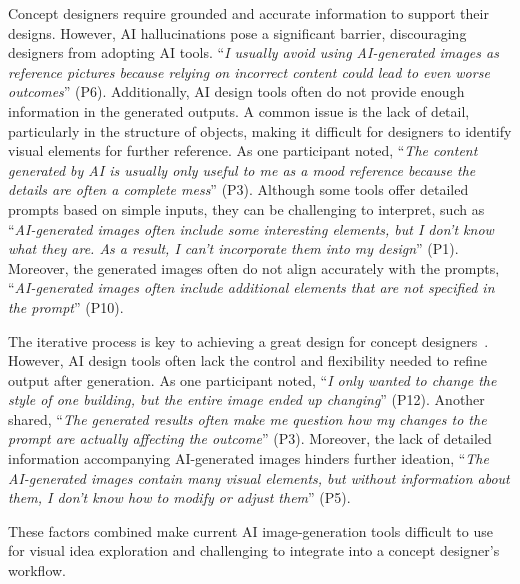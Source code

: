 Concept designers require grounded and accurate information to support their designs. However, AI hallucinations pose a significant barrier, discouraging designers from adopting AI tools. “\textit{I usually avoid using AI-generated images as reference pictures because relying on incorrect content could lead to even worse outcomes}” (P6). Additionally, AI design tools often do not provide enough information in the generated outputs. A common issue is the lack of detail, particularly in the structure of objects, making it difficult for designers to identify visual elements for further reference. As one participant noted, “\textit{The content generated by AI is usually only useful to me as a mood reference because the details are often a complete mess}” (P3). Although some tools offer detailed prompts based on simple inputs, they can be challenging to interpret, such as “\textit{AI-generated images often include some interesting elements, but I don’t know what they are. As a result, I can’t incorporate them into my design}” (P1). Moreover, the generated images often do not align accurately with the prompts, “\textit{AI-generated images often include additional elements that are not specified in the prompt}” (P10).

The iterative process is key to achieving a great design for concept designers~\cite{iterationandreference2023}. However, AI design tools often lack the control and flexibility needed to refine output after generation. As one participant noted, “\textit{I only wanted to change the style of one building, but the entire image ended up changing}” (P12). Another shared, “\textit{The generated results often make me question how my changes to the prompt are actually affecting the outcome}” (P3). Moreover, the lack of detailed information accompanying AI-generated images hinders further ideation, “\textit{The AI-generated images contain many visual elements, but without information about them, I don’t know how to modify or adjust them}” (P5).

These factors combined make current AI image-generation tools difficult to use for visual idea exploration and challenging to integrate into a concept designer's workflow.

